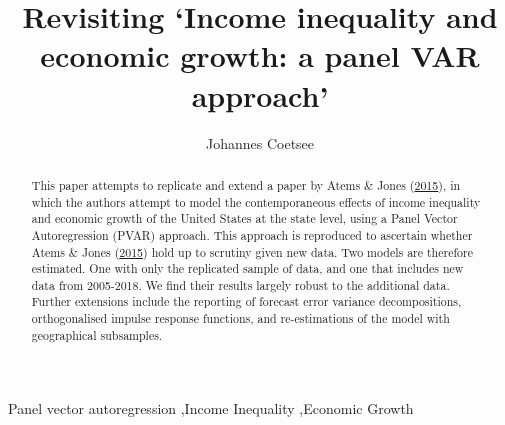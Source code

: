 \documentclass[11pt,preprint, authoryear]{elsarticle}
\numberwithin{equation}{section}
\numberwithin{figure}{section}
\numberwithin{table}{section}
\begin{document}
\begin{frontmatter}  %

\title{Revisiting `Income inequality and economic growth: a panel VAR approach'}





\author[Add1]{Johannes Coetsee}





\address[Add1]{Stellenbosch University}


\begin{abstract}
\small{
This paper attempts to replicate and extend a paper by Atems \& Jones
(\protect\hyperlink{ref-atems}{2015}), in which the authors attempt to
model the contemporaneous effects of income inequality and economic
growth of the United States at the state level, using a Panel Vector
Autoregression (PVAR) approach. This approach is reproduced to ascertain
whether Atems \& Jones (\protect\hyperlink{ref-atems}{2015}) hold up to
scrutiny given new data. Two models are therefore estimated. One with
only the replicated sample of data, and one that includes new data from
2005-2018. We find their results largely robust to the additional data.
Further extensions include the reporting of forecast error variance
decompositions, orthogonalised impulse response functions, and
re-estimations of the model with geographical subsamples.
}
\end{abstract}

\vspace{1cm}

\begin{keyword}
\footnotesize{
Panel vector autoregression \sep Income Inequality \sep Economic Growth \\ \vspace{0.3cm}
\textit{} 
}
\end{keyword}
\vspace{0.5cm}
\end{frontmatter}



\pagestyle{fancy}
\chead{}
\lfoot{}
\lhead{}
\cfoot{}

\end{document}
